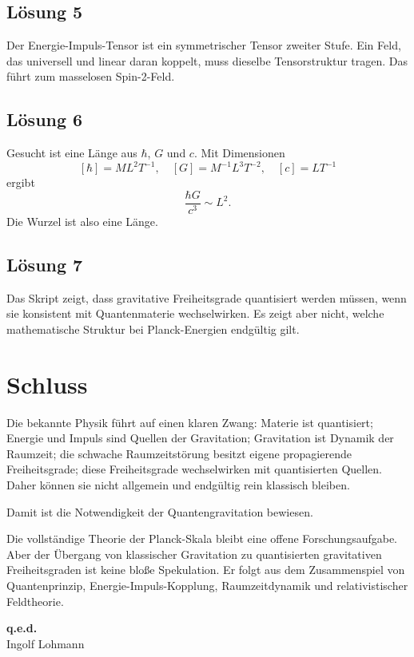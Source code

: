 \documentclass[11pt,a4paper,oneside]{book}
\theoremstyle{definition}
\theoremstyle{plain}
\theoremstyle{remark}
\begin{document}
\section*{Lösung 5}
Der Energie-Impuls-Tensor ist ein symmetrischer Tensor zweiter Stufe. Ein Feld, das universell und linear daran koppelt, muss dieselbe Tensorstruktur tragen. Das führt zum masselosen Spin-2-Feld.

\section*{Lösung 6}
Gesucht ist eine Länge aus $\hbar$, $G$ und $c$. Mit Dimensionen
\[
[\hbar]=ML^2T^{-1},\quad [G]=M^{-1}L^3T^{-2},\quad [c]=LT^{-1}
\]
ergibt
\[
\frac{\hbar G}{c^3}\sim L^2.
\]
Die Wurzel ist also eine Länge.

\section*{Lösung 7}
Das Skript zeigt, dass gravitative Freiheitsgrade quantisiert werden müssen, wenn sie konsistent mit Quantenmaterie wechselwirken. Es zeigt aber nicht, welche mathematische Struktur bei Planck-Energien endgültig gilt.

\chapter{Schluss}
Die bekannte Physik führt auf einen klaren Zwang: Materie ist quantisiert; Energie und Impuls sind Quellen der Gravitation; Gravitation ist Dynamik der Raumzeit; die schwache Raumzeitstörung besitzt eigene propagierende Freiheitsgrade; diese Freiheitsgrade wechselwirken mit quantisierten Quellen. Daher können sie nicht allgemein und endgültig rein klassisch bleiben.

Damit ist die Notwendigkeit der Quantengravitation bewiesen.

Die vollständige Theorie der Planck-Skala bleibt eine offene Forschungsaufgabe. Aber der Übergang von klassischer Gravitation zu quantisierten gravitativen Freiheitsgraden ist keine bloße Spekulation. Er folgt aus dem Zusammenspiel von Quantenprinzip, Energie-Impuls-Kopplung, Raumzeitdynamik und relativistischer Feldtheorie.

\begin{center}
\textbf{q.e.d.}\\[2mm]
Ingolf Lohmann
\end{center}
\end{document}
